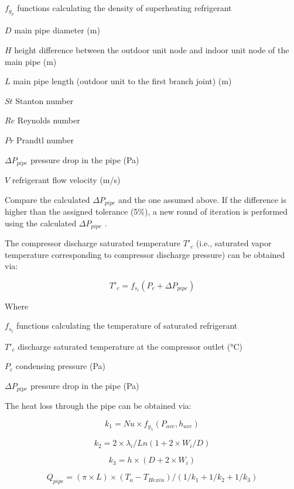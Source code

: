\(f_{g_\rho}\) functions calculating the density of superheating refrigerant

\(D\) main pipe diameter (m)

\(H\) height difference between the outdoor unit node and indoor unit node of the main pipe (m)

\(L\) main pipe length (outdoor unit to the first branch joint) (m)

\(St\) Stanton number

\(Re\) Reynolds number

\(Pr\) Prandtl number

\(\Delta{P_{pipe}}\) pressure drop in the pipe (Pa)

\(V\) refrigerant flow velocity (m/s)

Compare the calculated \(\Delta{P_{pipe}}\) and the one assumed above. If the difference is higher than the assigned tolerance (5\%), a new round of iteration is performed using the calculated \(\Delta{P_{pipe}}\) .

The compressor discharge saturated temperature \(T'_c\) (i.e., saturated vapor temperature corresponding to compressor discharge pressure) can be obtained via:

\begin{equation}
T'_c = f_{s_t}(P_c+\Delta{P_{pipe}})
\end{equation}

Where

\(f_{s_t}\) functions calculating the temperature of saturated refrigerant

\(T'_c\) discharge saturated temperature at the compressor outlet (°C)

\(P_c\) condensing pressure (Pa)

\(\Delta{P_{pipe}}\) pressure drop in the pipe (Pa)

The heat loss through the pipe can be obtained via:

\begin{equation}
k_1 = Nu\times{f_{g_\lambda}(P_{ave},h_{ave})}
\end{equation}

\begin{equation}
k_2 = 2\times{\lambda_i}/Ln(1+2\times{W_i}/D)
\end{equation}

\begin{equation}
k_3 = h\times(D+2\times{W_i})
\end{equation}

\begin{equation}
Q_{pipe} = (\pi\times{L})\times(T_a-T_{Hexin})/(1/k_1+1/k_2+1/k_3)
\end{equation}

